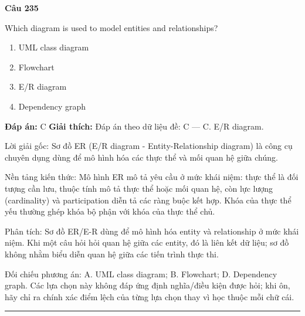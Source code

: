 \documentclass[11pt,a4paper]{article}
\newenvironment{question}[1]{%
  \par\vspace{1em}\noindent\textbf{\large Câu #1}\par\vspace{0.4em}
}{%
  \par\vspace{1em}\hrule\vspace{0.6em}
}
\newenvironment{choices}{%
  \begin{enumerate}[label=\textbf{\Alph*.},leftmargin=2.2em,itemsep=2pt,topsep=3pt]
}{%
  \end{enumerate}
}
\newcommand{\choice}{\item}
\begin{document}
\begin{question}{235}
Which diagram is used to model entities and relationships?
\begin{choices}
\choice UML class diagram
\choice Flowchart
\choice E/R diagram
\choice Dependency graph
\end{choices}
\textbf{Đáp án:} C
\textbf{Giải thích:} Đáp án theo dữ liệu đề: C — C. E/R diagram.

Lời giải gốc: Sơ đồ ER (E/R diagram - Entity-Relationship diagram) là công cụ chuyên dụng dùng để mô hình hóa các thực thể và mối quan hệ giữa chúng.

Nền tảng kiến thức: Mô hình ER mô tả yêu cầu ở mức khái niệm: thực thể là đối tượng cần lưu, thuộc tính mô tả thực thể hoặc mối quan hệ, còn lực lượng (cardinality) và participation diễn tả các ràng buộc kết hợp. Khóa của thực thể yếu thường ghép khóa bộ phận với khóa của thực thể chủ.

Phân tích: Sơ đồ ER/E-R dùng để mô hình hóa entity và relationship ở mức khái niệm. Khi một câu hỏi hỏi quan hệ giữa các entity, đó là liên kết dữ liệu; sơ đồ không nhằm biểu diễn quan hệ giữa các tiến trình thực thi.

Đối chiếu phương án: A. UML class diagram; B. Flowchart; D. Dependency graph. Các lựa chọn này không đáp ứng định nghĩa/điều kiện được hỏi; khi ôn, hãy chỉ ra chính xác điểm lệch của từng lựa chọn thay vì học thuộc mỗi chữ cái.
\end{question}
\end{document}
